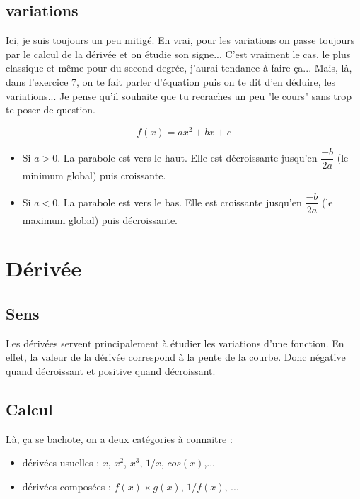 \documentclass[11pt]{article}
\begin{document}
\subsection{variations}

Ici, je suis toujours un peu mitigé. En vrai, pour les variations on passe toujours par le calcul de la dérivée et on étudie son signe... C'est vraiment le cas, le plus classique et même pour du second degrée, j'aurai tendance à faire ça... Mais, là, dans l'exercice 7, on te fait parler d'équation puis on te dit d'en déduire, les variations... Je pense qu'il souhaite que tu recraches un peu "le cours" sans trop te poser de question.

$$f(x) = ax^2 +bx +c$$

\begin{itemize}
\item Si $a>0$. La parabole est vers le haut. Elle est décroissante jusqu'en $\dfrac{-b}{2a}$ (le minimum global) puis croissante. 
\item Si $a<0$. La parabole est vers le bas. Elle est croissante jusqu'en $\dfrac{-b}{2a}$ (le maximum global) puis décroissante. 
\end{itemize}

\section{Dérivée}

\subsection{Sens}
Les dérivées servent principalement à étudier les variations d'une fonction. En effet, la valeur de la dérivée correspond à la pente de la courbe. Donc négative quand décroissant et positive quand décroissant. 

\subsection{Calcul}

Là, ça se bachote, on a deux catégories à connaitre :

\begin{itemize}
\item dérivées usuelles : $x$, $x^2$, $x^3$, $1/x$, $cos(x)$,...
\item dérivées composées : $f(x) \times g(x)$, $1 / f(x)$, ... 
\end{itemize}

\newpage
\end{document}
